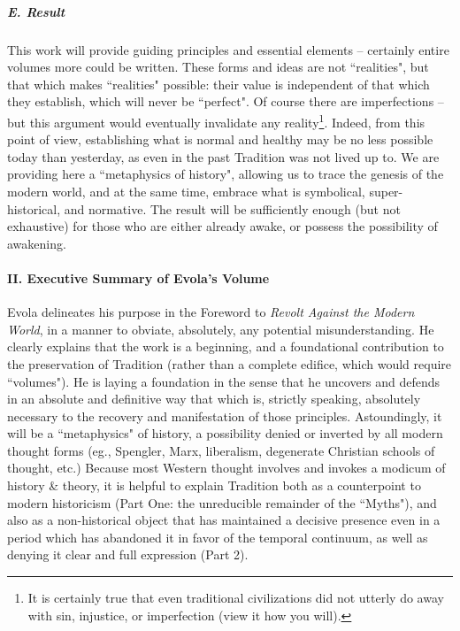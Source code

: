 \subparagraph{E. Result}
This work will provide guiding principles and essential elements – certainly entire volumes more could be written. These forms and ideas are not ``realities", but that which makes ``realities" possible: their value is independent of that which they establish, which will never be ``perfect". Of course there are imperfections – but this argument would eventually invalidate any reality\footnote{It is certainly true that even traditional civilizations did not utterly do away with sin, injustice, or imperfection (view it how you will).}. Indeed, from this point of view, establishing what is normal and healthy may be no less possible today than yesterday, as even in the past Tradition was not lived up to. We are providing here a ``metaphysics of history", allowing us to trace the genesis of the modern world, and at the same time, embrace what is symbolical, super-historical, and normative. The result will be sufficiently enough (but not exhaustive) for those who are either already awake, or possess the possibility of awakening.

\paragraph{II. Executive Summary of Evola's Volume}
Evola delineates his purpose in the Foreword to \emph{Revolt Against the Modern World}, in a manner to obviate, absolutely, any potential misunderstanding. He clearly explains that the work is a beginning, and a foundational contribution to the preservation of Tradition (rather than a complete edifice, which would require ``volumes"). He is laying a foundation in the sense that he uncovers and defends in an absolute and definitive way that which is, strictly speaking, absolutely necessary to the recovery and manifestation of those principles. Astoundingly, it will be a ``metaphysics" of history, a possibility denied or inverted by all modern thought forms (eg., Spengler, Marx, liberalism, degenerate Christian schools of thought, etc.) Because most Western thought involves and invokes a modicum of history \& theory, it is helpful to explain Tradition both as a counterpoint to modern historicism (Part One: the unreducible remainder of the ``Myths"), and also as a non-historical object that has maintained a decisive presence even in a period which has abandoned it in favor of the temporal continuum, as well as denying it clear and full expression (Part 2).

